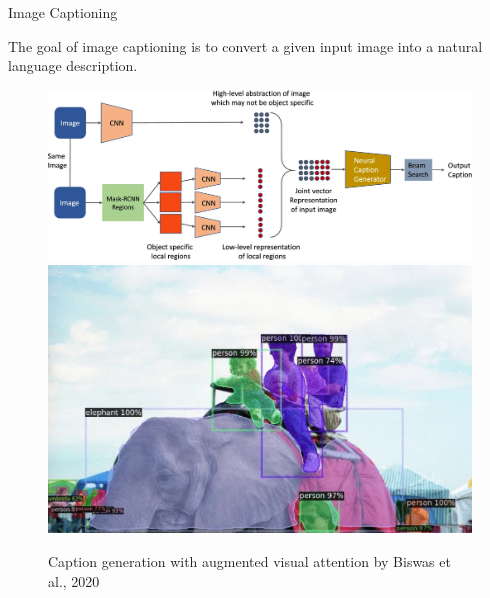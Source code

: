 \begin{vbframe}{Image Captioning}

The goal of image captioning is to convert a given input image into a natural language description.

\begin{figure}
\centering
\begin{minipage}{.65\textwidth}
  \centering
  \includegraphics[width=.9\linewidth]{figure/caption_generation.png}
\end{minipage}%
\begin{minipage}{.35\textwidth}
  \centering
  \includegraphics[width=.9\linewidth]{figure/example_sample_generation.png}
\end{minipage}
\caption\tiny{Caption generation with augmented visual attention by Biswas et al., 2020}
\end{figure}

\end{vbframe}


\endlecture
